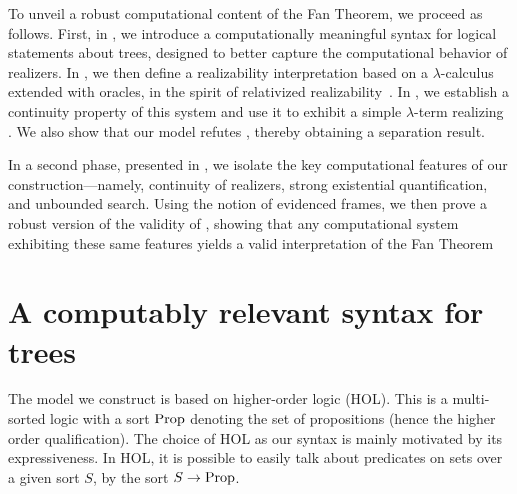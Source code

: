 \documentclass[a4paper,UKenglish,cleveref, autoref, thm-restate]{lipics-v2021}
\begin{document}
To unveil a robust computational content of the Fan Theorem, we proceed as follows. First, in , we introduce a computationally meaningful syntax for logical statements about trees, designed to better capture the computational behavior of realizers. In , we then define a realizability interpretation based on a $\lambda$-calculus extended with oracles, in the spirit of relativized realizability~\cite{Goodman1978}. In , we establish a continuity property of this system and use it to exhibit a simple $\lambda$-term realizing \FT. We also show that our model refutes \WKL, thereby obtaining a separation result.

In a second phase, presented in , we isolate the key computational features of our construction—namely, continuity of realizers, strong existential quantification, and unbounded search. Using the notion of evidenced frames, we then prove a robust version of the validity of \FT, showing that any computational system exhibiting these same features yields a valid interpretation of the Fan Theorem









\newcommand{\ZFC}{ZFC}
\newcommand{\ZF}{ZF}
\newcommand{\RCAO}{RCA0}
\newcommand{\RCA}{RCA}
\newcommand{\double}{double}
\newcommand{\intt}{int}
%
%

\section{A computably relevant syntax for trees}%
\label{s:HOL}

The model we construct is based on higher-order logic (HOL). This is a multi-sorted logic with a sort $\mathrm{Prop}$ denoting the set of propositions (hence the higher order qualification).
The choice of HOL as our syntax is mainly motivated by its expressiveness. In HOL, it is possible to easily talk about predicates on sets over a given sort $S$, by the sort $S \to \mathrm{Prop}$. %
\end{document}
